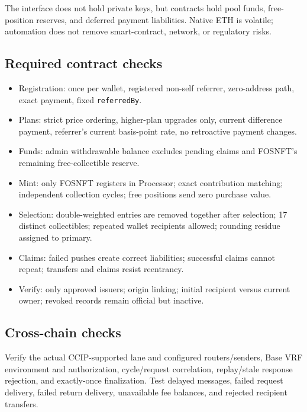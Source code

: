 \documentclass[
  10pt,
  letterpaper,
]{article}
\providecommand{\tightlist}{%
  \setlength{\itemsep}{0pt}\setlength{\parskip}{0pt}}
\begin{document}
The interface does not hold private keys, but contracts hold pool funds,
free-position reserves, and deferred payment liabilities. Native ETH is
volatile; automation does not remove smart-contract, network, or
regulatory risks.

\subsection{Required contract checks}\label{required-contract-checks}

\begin{itemize}
\tightlist
\item
  Registration: once per wallet, registered non-self referrer,
  zero-address path, exact payment, fixed \texttt{referredBy}.
\item
  Plans: strict price ordering, higher-plan upgrades only, current
  difference payment, referrer's current basis-point rate, no
  retroactive payment changes.
\item
  Funds: admin withdrawable balance excludes pending claims and FOSNFT's
  remaining free-collectible reserve.
\item
  Mint: only FOSNFT registers in Processor; exact contribution matching;
  independent collection cycles; free positions send zero purchase
  value.
\item
  Selection: double-weighted entries are removed together after
  selection; 17 distinct collectibles; repeated wallet recipients
  allowed; rounding residue assigned to primary.
\item
  Claims: failed pushes create correct liabilities; successful claims
  cannot repeat; transfers and claims resist reentrancy.
\item
  Verify: only approved issuers; origin linking; initial recipient
  versus current owner; revoked records remain official but inactive.
\end{itemize}

\subsection{Cross-chain checks}\label{cross-chain-checks}

Verify the actual CCIP-supported lane and configured routers/senders,
Base VRF environment and authorization, cycle/request correlation,
replay/stale response rejection, and exactly-once finalization. Test
delayed messages, failed request delivery, failed return delivery,
unavailable fee balances, and rejected recipient transfers.
\end{document}
